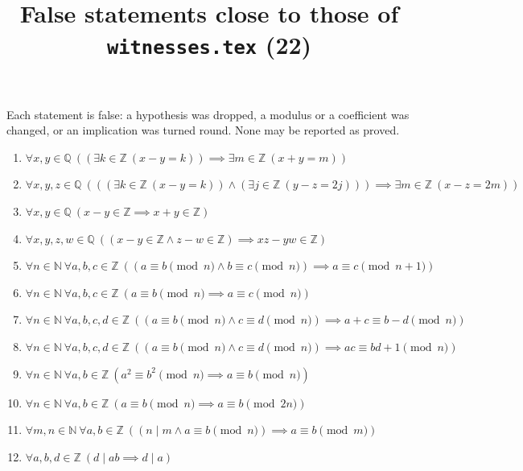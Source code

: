 \documentclass[11pt,a4paper]{article}
\title{False statements close to those of \texttt{witnesses.tex} (22)}
\author{}
\date{}
\begin{document}
\maketitle
Each statement is false: a hypothesis was dropped, a modulus or a coefficient was changed, or an implication was turned round. None may be reported as proved.

\begin{enumerate}
\item $\displaystyle \forall x, y \in \mathbb{Q}\ ((\exists k \in \mathbb{Z}\ (x - y = k)) \implies \exists m \in \mathbb{Z}\ (x + y = m))$
\item $\displaystyle \forall x, y, z \in \mathbb{Q}\ (((\exists k \in \mathbb{Z}\ (x - y = k)) \land (\exists j \in \mathbb{Z}\ (y - z = 2j))) \implies \exists m \in \mathbb{Z}\ (x - z = 2m))$
\item $\displaystyle \forall x, y \in \mathbb{Q}\ (x - y \in \mathbb{Z} \implies x + y \in \mathbb{Z})$
\item $\displaystyle \forall x, y, z, w \in \mathbb{Q}\ ((x - y \in \mathbb{Z} \land z - w \in \mathbb{Z}) \implies xz - yw \in \mathbb{Z})$
\item $\displaystyle \forall n \in \mathbb{N}\ \forall a, b, c \in \mathbb{Z}\ ((a \equiv b \pmod{n} \land b \equiv c \pmod{n}) \implies a \equiv c \pmod{n + 1})$
\item $\displaystyle \forall n \in \mathbb{N}\ \forall a, b, c \in \mathbb{Z}\ (a \equiv b \pmod{n} \implies a \equiv c \pmod{n})$
\item $\displaystyle \forall n \in \mathbb{N}\ \forall a, b, c, d \in \mathbb{Z}\ ((a \equiv b \pmod{n} \land c \equiv d \pmod{n}) \implies a + c \equiv b - d \pmod{n})$
\item $\displaystyle \forall n \in \mathbb{N}\ \forall a, b, c, d \in \mathbb{Z}\ ((a \equiv b \pmod{n} \land c \equiv d \pmod{n}) \implies ac \equiv bd + 1 \pmod{n})$
\item $\displaystyle \forall n \in \mathbb{N}\ \forall a, b \in \mathbb{Z}\ (a^{2} \equiv b^{2} \pmod{n} \implies a \equiv b \pmod{n})$
\item $\displaystyle \forall n \in \mathbb{N}\ \forall a, b \in \mathbb{Z}\ (a \equiv b \pmod{n} \implies a \equiv b \pmod{2n})$
\item $\displaystyle \forall m, n \in \mathbb{N}\ \forall a, b \in \mathbb{Z}\ ((n \mid m \land a \equiv b \pmod{n}) \implies a \equiv b \pmod{m})$
\item $\displaystyle \forall a, b, d \in \mathbb{Z}\ (d \mid ab \implies d \mid a)$

\end{enumerate}
\end{document}
